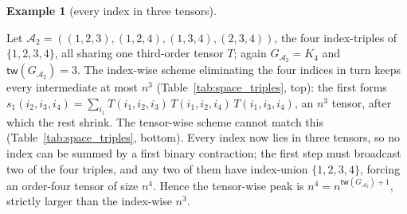 \documentclass[sn-mathphys, natbib=false]{sn-jnl}
\theoremstyle{plain}
\theoremstyle{definition}
\newtheorem{example}{Example}
\newcommand{\treewidthp}[1]{\mathsf{tw}(#1)}
\newcommand{\completegraphp}[1]{K_{#1}}
\newif\ifshowchanges
\newcommand{\rev}[1]{%
  \ifshowchanges
    {\color{red} #1}%
  \else
    #1%
  \fi
}
\def\calA{\mathcal{A}}
\begin{document}
\begin{bibunit}[agsm]
\begin{example}[every index in three tensors]
\label{eg:space_triples}
\rev{Let $\calA_2 = ((1,2,3),(1,2,4),(1,3,4),(2,3,4))$, the four index-triples of $\{1,2,3,4\}$, all sharing one third-order tensor $T$; again $G_{\calA_2} = \completegraphp{4}$ and $\treewidthp{G_{\calA_2}} = 3$. The index-wise scheme eliminating the four indices in turn keeps every intermediate at most $n^3$ (Table~\ref{tab:space_triples}, top): the first forms $s_1(i_2,i_3,i_4) = \sum_{i_1} T(i_1,i_2,i_3)\, T(i_1,i_2,i_4)\, T(i_1,i_3,i_4)$, an $n^3$ tensor, after which the rest shrink. The tensor-wise scheme cannot match this (Table~\ref{tab:space_triples}, bottom). Every index now lies in three tensors, so no index can be summed by a first binary contraction; the first step must broadcast two of the four triples, and any two of them have index-union $\{1,2,3,4\}$, forcing an order-four tensor of size $n^4$. Hence the tensor-wise peak is $n^4 = n^{\treewidthp{G_{\calA_2}}+1}$, strictly larger than the index-wise $n^3$.}
\end{example}


\end{bibunit}
\end{document}
